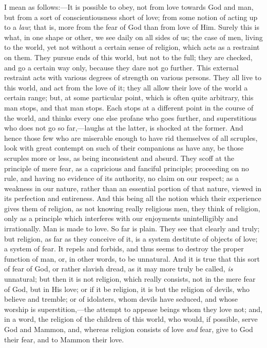 I mean as follows:—It is possible to obey, not from love towards
God and man, but from a sort of conscientiousness short of love; from
some notion of acting up to a \emph{law}; that is, more from the fear of God
than from love of Him. Surely this is what, in one shape or other, we
see daily on all sides of us; the case of men, living to the world,
yet not without a certain sense of religion, which acts as a restraint
on them. They pursue ends of this world, but not to the full; they are
checked, and go a certain way only, because they dare not go further.
This external restraint acts with various degrees of strength on
various persons. They all live to this world, and act from the love of
it; they all allow their love of the world a certain range; but, at
some particular point, which is often quite arbitrary, this man stops,
and that man stops. Each stops at a different point in the course of
the world, and thinks every one else profane who goes further, and
superstitious who does not go so far,—laughs at the latter, is
shocked at the former. And hence those few who are miserable enough to
have rid themselves of all scruples, look with great contempt on such
of their companions as have any, be those scruples more or less, as
being inconsistent and absurd. They scoff at the principle of mere
fear, as a capricious and fanciful principle; proceeding on no rule,
and having no evidence of its authority, no claim on our respect; as a
weakness in our nature, rather than an essential portion of that
nature, viewed in its perfection and entireness. And this being all
the notion which their experience gives them of religion, as not
knowing really religious men, they think of religion, only as a
principle which interferes with our enjoyments unintelligibly and
irrationally. Man is made to love. So far is plain. They see that
clearly and truly; but religion, as far as they conceive of it, is a
system destitute of objects of love; a system of fear. It repels and
forbids, and thus seems to destroy the proper function of man, or, in
other words, to be unnatural. And it is true that this sort of fear of
God, or rather slavish dread, as it may more truly be called, \emph{is}
unnatural; but then it is not religion, which really consists, not in
the mere fear of God, but in His love; or if it be religion, it is but
the religion of devils, who believe and tremble; or of idolaters, whom
devils have seduced, and whose worship is superstition,—the attempt
to appease beings whom they love not; and, in a word, the religion of
the children of this world, who would, if possible, serve God and
Mammon, and, whereas religion consists of love \emph{and} fear, give to God
their fear, and to Mammon their love.

